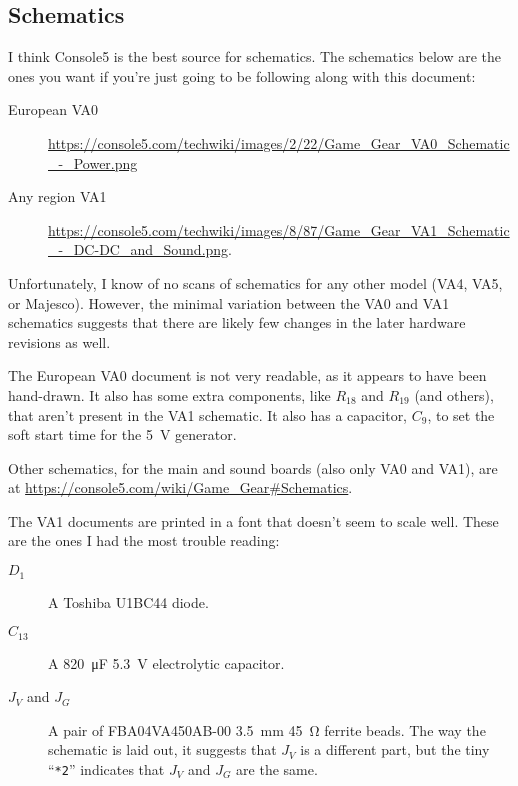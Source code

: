 \documentclass{article}
\newcommand{\model}{\textsf}
\begin{document}
\subsection{Schematics}
\label{sec:documents_schematics}
I think Console5 is the best source for schematics. The schematics
below are the ones you want if you're just going to be following along
with this document:
\begin{description}
\item[European \model{VA0}]
  \url{https://console5.com/techwiki/images/2/22/Game_Gear_VA0_Schematic_-_Power.png}
\item[Any region \model{VA1}]
  \url{https://console5.com/techwiki/images/8/87/Game_Gear_VA1_Schematic_-_DC-DC_and_Sound.png}.
\end{description}

Unfortunately, I know of no scans of schematics for any other model
(\model{VA4}, \model{VA5}, or Majesco). However, the minimal variation
between the \model{VA0} and \model{VA1} schematics suggests that there
are likely few changes in the later hardware revisions as well.

The European \model{VA0} document is not very readable, as it appears
to have been hand-drawn. It also has some extra components, like
$R_{18}$ and $R_{19}$ (and others), that aren't present in the
\model{VA1} schematic. It also has a capacitor, $C_9$, to set the soft
start time for the \qty{5}{\volt} generator.

Other schematics, for the main and sound boards (also only \model{VA0}
and \model{VA1}), are at
\url{https://console5.com/wiki/Game_Gear#Schematics}.

The \model{VA1} documents are printed in a font that doesn't seem to
scale well. These are the ones I had the most trouble reading:

\begin{description}
\item[$D_1$] A Toshiba \model{U1BC44} diode.
\item[$C_{13}$] A \qty{820}{\micro\farad} \qty{5.3}{\volt}
  electrolytic capacitor.
  
\item[$J_V$ and $J_G$] A pair of \model{FBA04VA450AB-00}
  \qty{3.5}{\milli\meter} \qty{45}{\ohm} ferrite beads. The way the
  schematic is laid out, it suggests that $J_V$ is a different part,
  but the tiny ``\texttt{*2}'' indicates that $J_V$ and $J_G$ are the
  same.
\end{description}
\end{document}
